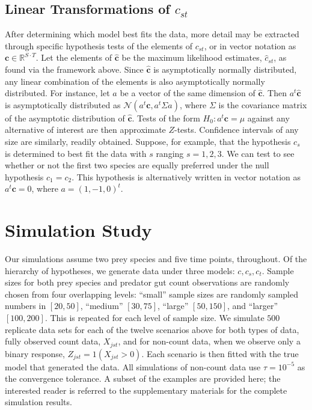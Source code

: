 \documentclass[smallextended]{svjour3}
\begin{document}
\subsection{Linear Transformations of $c_{st}$}

After determining which model best fits the data, more detail may be extracted through specific hypothesis tests of the elements of $c_{st}$, or in vector notation as $\mathbf{c} \in \mathbb{R}^{S\cdot T}$.  Let the elements of $\hat{\mathbf{c}}$ be the maximum likelihood estimates, $\hat{c}_{st}$, as found via the framework above.  Since $\hat{\mathbf{c}}$ is asymptotically normally distributed, any linear combination of the elements is also asymptotically normally distributed.  For instance, let $a$ be a vector of the same dimension of $\hat{\mathbf{c}}$.  Then $a^t\hat{\mathbf{c}}$ is asymptotically distributed as $\mathcal{N}(a^t\mathbf{c}, a^t\Sigma a)$, where $\Sigma$ is the covariance matrix of the asymptotic distribution of $\hat{\mathbf{c}}$.  Tests of the form $H_0: a^t\mathbf{c} = \mu$ against any alternative of interest are then approximate $Z$-tests.  Confidence intervals of any size are similarly, readily obtained.  Suppose, for example, that the hypothesis $c_s$ is determined to best fit the data with $s$ ranging $s = 1, 2, 3$.  We can test to see whether or not the first two species are equally preferred under the null hypothesis $c_{1} = c_{2}$.  This hypothesis is alternatively written in vector notation as $a^t\mathbf{c} = 0$, where $a = (1, -1, 0)^t$.  

\section{Simulation Study}
\label{sec:sim}

Our simulations assume two prey species and five time points, throughout.  Of the hierarchy of hypotheses, we generate data under three models: $c, c_s, c_t$.  Sample sizes for both prey species and predator gut count observations are randomly chosen from four overlapping levels: ``small'' sample sizes are randomly sampled numbers in $[20,50]$, ``medium'' $[30,75]$, ``large'' $[50,150]$, and ``larger'' $[100,200]$.  This is repeated for each level of sample size.  We simulate $500$ replicate data sets for each of the twelve scenarios above for both types of data, fully observed count data, $X_{jst}$, and for non-count data, when we observe only a binary response, $Z_{jst} = 1(X_{jst}>0)$.  Each scenario is then fitted with the true model that generated the data.  All simulations of non-count data use $\tau = 10^{-5}$ as the convergence tolerance.  A subset of the examples are provided here; the interested reader is referred to the supplementary materials for the complete simulation results.
\end{document}
